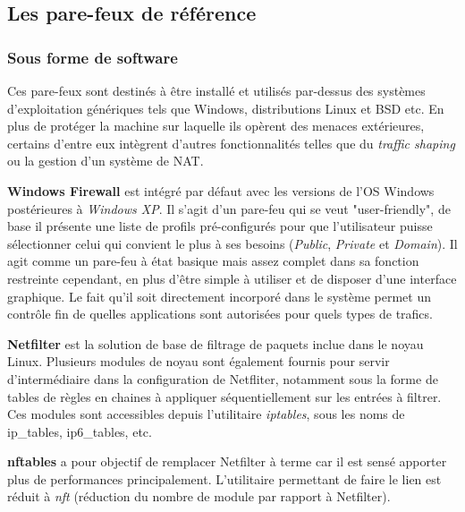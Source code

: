 \documentclass[]{article}
\newcommand{\minit}[1]{\noindent{\small\textbf{ \underline{#1}}}\vspace{0.2cm}}
\begin{document}
\subsection{Les pare-feux de référence}

\subsubsection{Sous forme de software}

\par Ces pare-feux sont destinés à être installé et utilisés par-dessus des systèmes d'exploitation génériques tels que Windows, distributions Linux et BSD etc. En plus de protéger la machine sur laquelle ils opèrent des menaces extérieures, certains d'entre eux intègrent d'autres fonctionnalités telles que du \textit{traffic shaping} ou la gestion d'un système de NAT.\\

\minit{Windows}

\par \textbf{Windows Firewall} est intégré par défaut avec les versions de l'OS Windows postérieures à \textit{Windows XP}. Il s'agit d'un pare-feu qui se veut "user-friendly", de base il présente une liste de profils pré-configurés pour que l'utilisateur puisse sélectionner celui qui convient le plus à ses besoins (\textit{Public}, \textit{Private} et \textit{Domain}). Il agit comme un pare-feu à état basique mais assez complet dans sa fonction restreinte cependant, en plus d'être simple à utiliser et de disposer d'une interface graphique. Le fait qu'il soit directement incorporé dans le système permet un contrôle fin de quelles applications sont autorisées pour quels types de trafics.\\

\minit{Linux}

\par \textbf{Netfilter} est la solution de base de filtrage de paquets inclue dans le noyau Linux. Plusieurs modules de noyau sont également fournis pour servir d'intermédiaire dans la configuration de Netfliter, notamment sous la forme de tables de règles en chaines à appliquer séquentiellement sur les entrées à filtrer. Ces modules sont accessibles depuis l'utilitaire \textit{iptables}, sous les noms de ip\_tables, ip6\_tables, etc.\\

\par \textbf{nftables} a pour objectif de remplacer Netfilter à terme car il est sensé apporter plus de performances principalement. L'utilitaire permettant de faire le lien est réduit à \textit{nft} (réduction du nombre de module par rapport à Netfilter).\\
\end{document}
